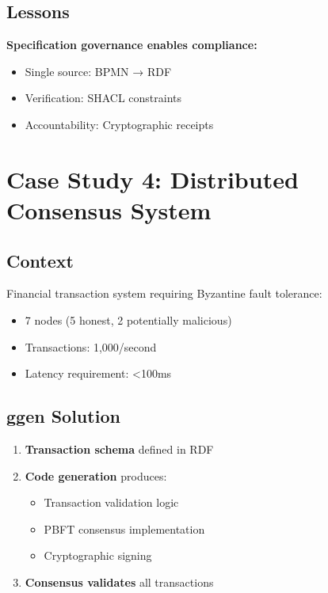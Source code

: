 \subsection{Lessons}

\textbf{Specification governance enables compliance:}
\begin{itemize}
    \item Single source: BPMN → RDF
    \item Verification: SHACL constraints
    \item Accountability: Cryptographic receipts
\end{itemize}

\section{Case Study 4: Distributed Consensus System}

\subsection{Context}

Financial transaction system requiring Byzantine fault tolerance:
\begin{itemize}
    \item 7 nodes (5 honest, 2 potentially malicious)
    \item Transactions: 1,000/second
    \item Latency requirement: <100ms
\end{itemize}

\subsection{ggen Solution}

\begin{enumerate}
    \item \textbf{Transaction schema} defined in RDF
    \item \textbf{Code generation} produces:
        \begin{itemize}
            \item Transaction validation logic
            \item PBFT consensus implementation
            \item Cryptographic signing
        \end{itemize}
    \item \textbf{Consensus validates} all transactions
\end{enumerate}

